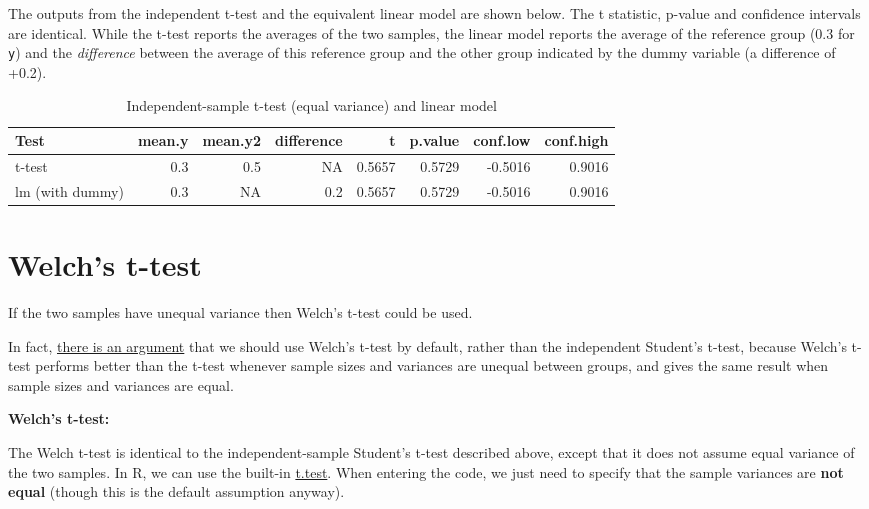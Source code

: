 \documentclass[
  12pt,
]{krantz}
\begin{document}
The outputs from the independent t-test and the equivalent linear model are shown below. The t statistic, p-value and confidence intervals are identical. While the t-test reports the averages of the two samples, the linear model reports the average of the reference group (0.3 for \texttt{y}) and the \emph{difference} between the average of this reference group and the other group indicated by the dummy variable (a difference of +0.2).

\begin{table}

\caption{\label{tab:unnamed-chunk-31}Independent-sample t-test (equal variance) and linear model}
\centering
\begin{tabular}[t]{lrrrrrrr}
\toprule
Test & mean.y & mean.y2 & difference & t & p.value & conf.low & conf.high\\
\midrule
t-test & 0.3 & 0.5 & NA & 0.5657 & 0.5729 & -0.5016 & 0.9016\\
lm (with dummy) & 0.3 & NA & 0.2 & 0.5657 & 0.5729 & -0.5016 & 0.9016\\
\bottomrule
\end{tabular}
\end{table}

\hypertarget{welchs-t-test}{%
\section{Welch's t-test}\label{welchs-t-test}}

If the two samples have unequal variance then Welch's t-test could be used.

In fact, \href{http://daniellakens.blogspot.com/2015/01/always-use-welchs-t-test-instead-of.html}{there is an argument} that we should use Welch's t-test by default, rather than the independent Student's t-test, because Welch's t-test performs better than the t-test whenever sample sizes and variances are unequal between groups, and gives the same result when sample sizes and variances are equal.

\textbf{Welch's t-test:}

The Welch t-test is identical to the independent-sample Student's t-test described above, except that it does not assume equal variance of the two samples. In R, we can use the built-in \href{https://www.rdocumentation.org/packages/stats/versions/3.5.3/topics/t.test}{t.test}. When entering the code, we just need to specify that the sample variances are \textbf{not equal} (though this is the default assumption anyway).
\end{document}
